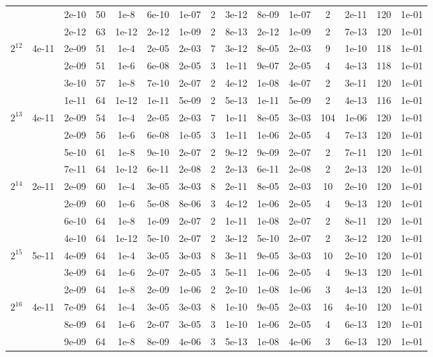 \documentclass[11pt]{article}
\begin{document}
\begin{table}[!htbp]
\begin{tabular}{|c|c|c|c|c|c|c|c|c|c|c|c|c|c|c|}
~ & ~ & 2e-10 & 50 & 1e-8 & 6e-10 & 1e-07 & 2 & 3e-12 & 8e-09 & 1e-07 & 2 & 2e-11 & 120 & 1e-01\\
~ & ~ & 2e-12 & 63 & 1e-12 & 2e-12 & 1e-09 & 2 & 8e-13 & 2e-12 & 1e-09 & 2 & 7e-13 & 120 & 1e-01\\
\hline
$2^{12}$ & 4e-11 & 2e-09 & 51 & 1e-4 & 2e-05 & 2e-03 & 7 & 3e-12 & 8e-05 & 2e-03 & 9 & 1e-10 & 118 & 1e-01\\
~ & ~ & 2e-09 & 51 & 1e-6 & 6e-08 & 2e-05 & 3 & 1e-11 & 9e-07 & 2e-05 & 4 & 4e-13 & 118 & 1e-01\\
~ & ~ & 3e-10 & 57 & 1e-8 & 7e-10 & 2e-07 & 2 & 4e-12 & 1e-08 & 4e-07 & 2 & 3e-11 & 120 & 1e-01\\
~ & ~ & 1e-11 & 64 & 1e-12 & 1e-11 & 5e-09 & 2 & 5e-13 & 1e-11 & 5e-09 & 2 & 4e-13 & 116 & 1e-01\\
\hline
$2^{13}$ & 4e-11 & 2e-09 & 54 & 1e-4 & 2e-05 & 2e-03 & 7 & 1e-11 & 8e-05 & 3e-03 & 104 & 1e-06 & 120 & 1e-01\\
~ & ~ & 2e-09 & 56 & 1e-6 & 6e-08 & 1e-05 & 3 & 1e-11 & 1e-06 & 2e-05 & 4 & 7e-13 & 120 & 1e-01\\
~ & ~ & 5e-10 & 61 & 1e-8 & 9e-10 & 2e-07 & 2 & 9e-12 & 9e-09 & 2e-07 & 2 & 7e-11 & 120 & 1e-01\\
~ & ~ & 7e-11 & 64 & 1e-12 & 6e-11 & 2e-08 & 2 & 2e-13 & 6e-11 & 2e-08 & 2 & 2e-13 & 120 & 1e-01\\
\hline
$2^{14}$ & 2e-11 & 2e-09 & 60 & 1e-4 & 3e-05 & 3e-03 & 8 & 2e-11 & 8e-05 & 2e-03 & 10 & 2e-10 & 120 & 1e-01\\
~ & ~ & 2e-09 & 60 & 1e-6 & 5e-08 & 8e-06 & 3 & 4e-12 & 1e-06 & 2e-05 & 4 & 9e-13 & 120 & 1e-01\\
~ & ~ & 6e-10 & 64 & 1e-8 & 1e-09 & 2e-07 & 2 & 1e-11 & 1e-08 & 2e-07 & 2 & 8e-11 & 120 & 1e-01\\
~ & ~ & 4e-10 & 64 & 1e-12 & 5e-10 & 2e-07 & 2 & 3e-12 & 5e-10 & 2e-07 & 2 & 3e-12 & 120 & 1e-01\\
\hline
$2^{15}$ & 5e-11 & 4e-09 & 64 & 1e-4 & 3e-05 & 3e-03 & 8 & 3e-11 & 9e-05 & 3e-03 & 10 & 2e-10 & 120 & 1e-01\\
~ & ~ & 3e-09 & 64 & 1e-6 & 2e-07 & 2e-05 & 3 & 5e-11 & 1e-06 & 2e-05 & 4 & 9e-13 & 120 & 1e-01\\
~ & ~ & 2e-09 & 64 & 1e-8 & 2e-09 & 1e-06 & 2 & 2e-10 & 1e-08 & 1e-06 & 3 & 4e-13 & 120 & 1e-01\\
\hline
$2^{16}$ & 4e-11 & 7e-09 & 64 & 1e-4 & 3e-05 & 3e-03 & 8 & 1e-10 & 9e-05 & 2e-03 & 16 & 4e-10 & 120 & 1e-01\\
~ & ~ & 8e-09 & 64 & 1e-6 & 2e-07 & 3e-05 & 3 & 1e-10 & 1e-06 & 2e-05 & 4 & 6e-13 & 120 & 1e-01\\
~ & ~ & 9e-09 & 64 & 1e-8 & 8e-09 & 4e-06 & 3 & 5e-13 & 1e-08 & 4e-06 & 3 & 6e-13 & 120 & 1e-01\\



\end{tabular}
\end{table}
\end{document}
